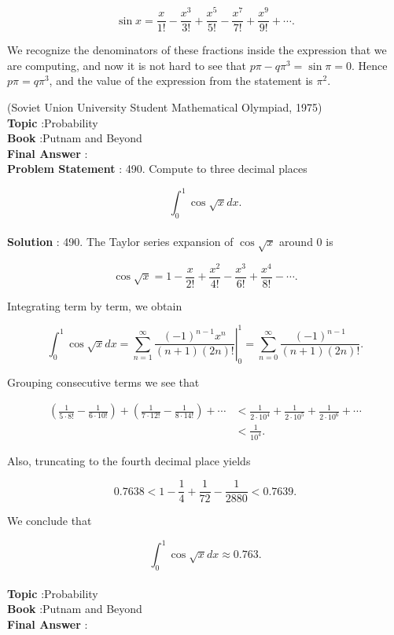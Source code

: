 \documentclass[10pt]{article}
\begin{document}
$$
\sin x=\frac{x}{1 !}-\frac{x^{3}}{3 !}+\frac{x^{5}}{5 !}-\frac{x^{7}}{7 !}+\frac{x^{9}}{9 !}+\cdots .
$$

We recognize the denominators of these fractions inside the expression that we are computing, and now it is not hard to see that $p \pi-q \pi^{3}=\sin \pi=0$. Hence $p \pi=q \pi^{3}$, and the value of the expression from the statement is $\pi^{2}$.

(Soviet Union University Student Mathematical Olympiad, 1975) 
\\
\textbf{Topic} :Probability\\
\textbf{Book} :Putnam and Beyond\\
\textbf{Final Answer} :\\


\textbf{Problem Statement} :
490. Compute to three decimal places

$$
\int_{0}^{1} \cos \sqrt{x} d x .
$$
\\
\textbf{Solution} :
490. The Taylor series expansion of $\cos \sqrt{x}$ around 0 is

$$
\cos \sqrt{x}=1-\frac{x}{2 !}+\frac{x^{2}}{4 !}-\frac{x^{3}}{6 !}+\frac{x^{4}}{8 !}-\cdots .
$$

Integrating term by term, we obtain

$$
\int_{0}^{1} \cos \sqrt{x} d x=\left.\sum_{n=1}^{\infty} \frac{(-1)^{n-1} x^{n}}{(n+1)(2 n) !}\right|_{0} ^{1}=\sum_{n=0}^{\infty} \frac{(-1)^{n-1}}{(n+1)(2 n) !} .
$$

Grouping consecutive terms we see that

$$
\begin{aligned}
\left(\frac{1}{5 \cdot 8 !}-\frac{1}{6 \cdot 10 !}\right)+\left(\frac{1}{7 \cdot 12 !}-\frac{1}{8 \cdot 14 !}\right)+\cdots &<\frac{1}{2 \cdot 10^{4}}+\frac{1}{2 \cdot 10^{5}}+\frac{1}{2 \cdot 10^{6}}+\cdots \\
&<\frac{1}{10^{4}} .
\end{aligned}
$$

Also, truncating to the fourth decimal place yields

$$
0.7638<1-\frac{1}{4}+\frac{1}{72}-\frac{1}{2880}<0.7639 .
$$

We conclude that

$$
\int_{0}^{1} \cos \sqrt{x} d x \approx 0.763 .
$$
\\
\textbf{Topic} :Probability\\
\textbf{Book} :Putnam and Beyond\\
\textbf{Final Answer} :\\
\end{document}
